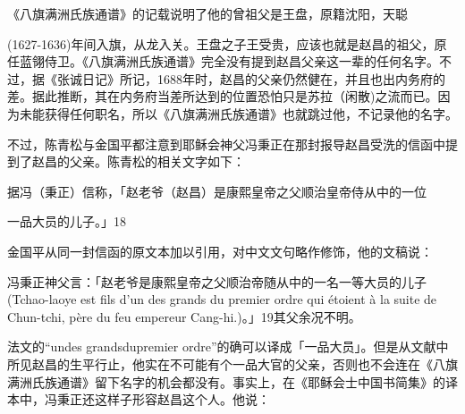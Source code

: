 \vfill
\begin{BookNotes}
\end{BookNotes}

\begin{BookQuote}
《八旗满洲氏族通谱》的记载说明了他的曾祖父是王盘，原籍沈阳，天聪
\end{BookQuote}

(1627-1636)年间入旗，从龙入关。王盘之子王受贵，应该也就是赵昌的祖父，原任蓝翎侍卫。《八旗满洲氏族通谱》完全没有提到赵昌父亲这一辈的任何名字。不过，据《张诚日记》所记，1688年时，赵昌的父亲仍然健在，并且也出内务府的差。据此推断，其在内务府当差所达到的位置恐怕只是苏拉（闲散)之流而已。因为未能获得任何职名，所以《八旗满洲氏族通谱》也就跳过他，不记录他的名字。

不过，陈青松与金国平都注意到耶稣会神父冯秉正在那封报导赵昌受洗的信函中提到了赵昌的父亲。陈青松的相关文字如下：

据冯（秉正）信称，「赵老爷（赵昌）是康熙皇帝之父顺治皇帝侍从中的一位

\begin{BookQuote}
一品大员的儿子。」18
\end{BookQuote}

金国平从同一封信函的原文本加以引用，对中文文句略作修饰，他的文稿说：

\begin{BookQuote}
冯秉正神父言：「赵老爷是康熙皇帝之父顺治帝随从中的一名一等大员的儿子(Tchao-laoye est fils d’un des grands du premier ordre qui étoient à la suite de Chun-tchi, père du feu empereur Cang-hi.)。」19其父余况不明。
\end{BookQuote}

法文的“undes grandsdupremier ordre”的确可以译成「一品大员」。但是从文献中所见赵昌的生平行止，他实在不可能有个一品大官的父亲，否则也不会连在《八旗满洲氏族通谱》留下名字的机会都没有。事实上，在《耶稣会士中国书简集》的译本中，冯秉正还这样子形容赵昌这个人。他说：


